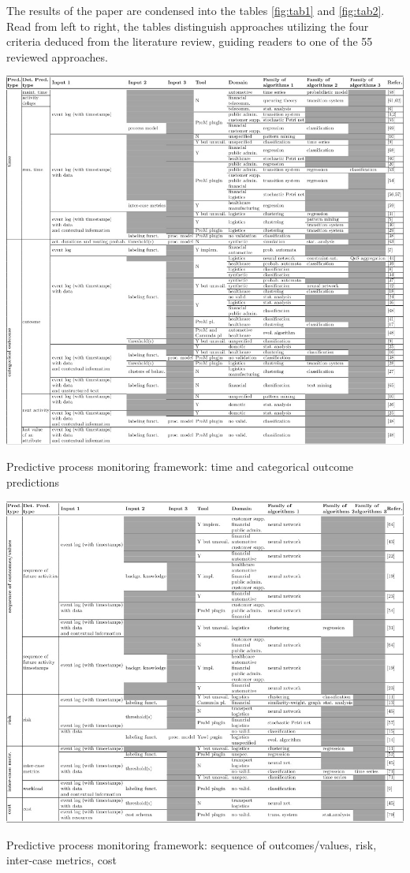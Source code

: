 \documentclass{llncs}
\begin{document}
{{{{{{\vspace{10 mm}

The results of the paper are condensed into the tables \ref{fig:tab1} and \ref{fig:tab2}. Read from left to right, the tables distinguish approaches utilizing the four criteria 
deduced from the literature review, guiding readers to one of the 55 reviewed approaches.

\begin{table}[H]
    \includegraphics[width=1\linewidth,center]{tabelle1.jpg}
    \caption{Predictive process monitoring framework: time and categorical outcome predictions \cite{di2018predictive}}
    \label{fig:tab1}
\end{table}

\begin{table}[H]
    \includegraphics[width=1\linewidth,center]{tabelle2.jpg}
    \caption{Predictive process monitoring framework: sequence of outcomes/values, risk, inter-case metrics, cost \cite{di2018predictive}}
    \label{fig:tab2}
\end{table}

}}}}}}
\end{document}
